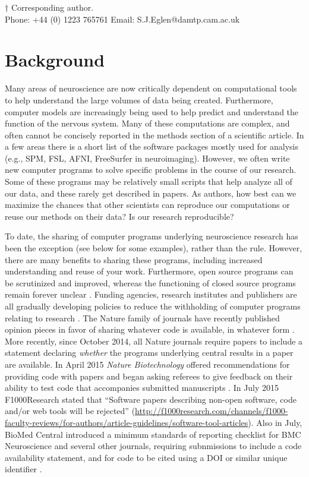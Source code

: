 \documentclass[11pt]{article}
\begin{document}
\noindent $\dagger$
Corresponding author.\\
\noindent Phone: +44 (0) 1223 765761
\noindent Email: S.J.Eglen@damtp.cam.ac.uk

\clearpage


\renewcommand{\cite}[1]{\autocite{#1}}

\linenumbers

\section*{Background}

Many areas of neuroscience are now critically dependent on
computational tools to help understand the large volumes of data being
created.  Furthermore, computer models are increasingly being used to
help predict and understand the function of the nervous system.  Many
of these computations are complex, and often cannot be concisely
reported in the methods section of a scientific article.  In a few
areas there is a short list of the software packages mostly used for
analysis (e.g., SPM, FSL, AFNI, FreeSurfer in neuroimaging).  However,
we often write new computer programs to solve specific problems in the
course of our research.  Some of these programs may be relatively
small scripts that help analyze all of our data, and these rarely get
described in papers.  As authors, how best can we maximize the chances
that other scientists can reproduce our computations or reuse our
methods on their data?  Is our research reproducible?

To date, the sharing of computer programs underlying neuroscience
research has been the exception (see below for some examples), rather than the rule.  However, there
are many benefits to sharing these programs, including increased
understanding and reuse of your work.  Furthermore, open source programs can be scrutinized and improved, whereas the functioning of closed source
programs remain forever unclear \cite{Vihinen2015}.  Funding agencies, research institutes and publishers are all gradually developing policies to
reduce the withholding of computer programs relating to research
\cite{Morin2012-65e}.  The Nature family of journals have recently
published opinion pieces in favor of sharing whatever code is
available, in whatever form \cite{Barnes2010-iv,Ince2012-225}.  More
recently, since October 2014, all Nature journals require papers to
include a statement declaring \textit{whether} the programs underlying central
results in a paper are available. In April 2015 \textit{Nature Biotechnology} offered recommendations for providing code with papers and began asking referees to give feedback on their ability to test code that accompanies submitted manuscripts \cite{NatBiotech2015}.
In July 2015 F1000Research stated that ``Software papers describing non-open software, code and/or web tools will be rejected'' (\url{http://f1000research.com/channels/f1000-faculty-reviews/for-authors/article-guidelines/software-tool-articles}). Also in July, BioMed Central introduced a minimum standards of reporting checklist for BMC Neuroscience and several other journals, requiring subnmissions to include a code availability statement, and for code to be cited using a DOI or similar unique identifier \cite{Kenall2015}.
\end{document}
